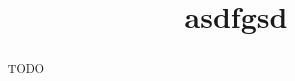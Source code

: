 \documentclass{article}
\title{asdfgsd}
\begin{document}
\maketitle

\begin{abstract}
TODO
\end{abstract}


%

\end{document}
